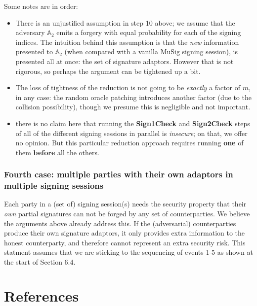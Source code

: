\documentclass[10pt,a4paper]{article}
\begin{document}
Some notes are in order:

\begin{itemize}
\item There is an unjustified assumption in step 10 above; we assume that the adversary $\mathbb{A}_2$ emits a forgery with equal probability for each of the signing indices. The intuition behind this assumption is that the \emph{new} information presented to $\mathbb{A}_2$ (when compared with a vanilla MuSig signing session), is presented all at once: the set of signature adaptors. However that is not rigorous, so perhaps the argument can be tightened up a bit.
\item The loss of tightness of the reduction is not going to be \emph{exactly} a factor of $m$, in any case: the random oracle patching introduces another factor (due to the collision possibility), though we presume this is negligible and not important.
\item there is no claim here that running the \textbf{Sign1Check} and \textbf{Sign2Check} steps of all of the different signing sessions in parallel is \emph{insecure}; on that, we offer no opinion. But this particular reduction approach requires running \textbf{one} of them \textbf{before} all the others.
\end{itemize}

\subsubsection{Fourth case: multiple parties with their own adaptors in multiple signing sessions}

Each party in a (set of) signing session(s) needs the security property that their \emph{own} partial signatures can not be forged by any set of counterparties. We believe the arguments above already address this. If the (adversarial) counterparties produce their own signature adaptors, it only provides extra information to the honest counterparty, and therefore cannot represent an extra security risk. This statment assumes that we are sticking to the sequencing of events 1-5 as shown at the start of Section 6.4.

\hypertarget{references}{%
\section[References]{\texorpdfstring{\protect\hypertarget{anchor-77}{}{}References}{References}}\label{references}}
\end{document}
